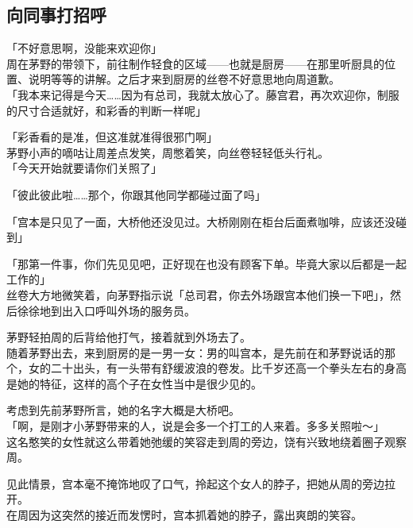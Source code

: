 \subsection{向同事打招呼}

「不好意思啊，没能来欢迎你」\\

周在茅野的带领下，前往制作轻食的区域——也就是厨房——在那里听厨具的位置、说明等等的讲解。之后才来到厨房的丝卷不好意思地向周道歉。\\

「我本来记得是今天……因为有总司，我就太放心了。藤宫君，再次欢迎你，制服的尺寸合适就好，和彩香的判断一样呢」

「彩香看的是准，但这准就准得很邪门啊」\\

茅野小声的嘀咕让周差点发笑，周憋着笑，向丝卷轻轻低头行礼。\\

「今天开始就要请你们关照了」

「彼此彼此啦……那个，你跟其他同学都碰过面了吗」

「宫本是只见了一面，大桥他还没见过。大桥刚刚在柜台后面煮咖啡，应该还没碰到」

「那第一件事，你们先见见吧，正好现在也没有顾客下单。毕竟大家以后都是一起工作的」\\

丝卷大方地微笑着，向茅野指示说「总司君，你去外场跟宫本他们换一下吧」，然后徐徐地到出入口呼叫外场的服务员。

茅野轻拍周的后背给他打气，接着就到外场去了。\\

随着茅野出去，来到厨房的是一男一女：男的叫宫本，是先前在和茅野说话的那个，女的二十出头，有一头带有舒缓波浪的卷发。比千岁还高一个拳头左右的身高是她的特征，这样的高个子在女性当中是很少见的。

考虑到先前茅野所言，她的名字大概是大桥吧。\\

「啊，是刚才小茅野带来的人，说是会多一个打工的人来着。多多关照啦～」\\

这名憨笑的女性就这么带着她弛缓的笑容走到周的旁边，饶有兴致地绕着圈子观察周。

见此情景，宫本毫不掩饰地叹了口气，拎起这个女人的脖子，把她从周的旁边拉开。\\

在周因为这突然的接近而发愣时，宫本抓着她的脖子，露出爽朗的笑容。\\

